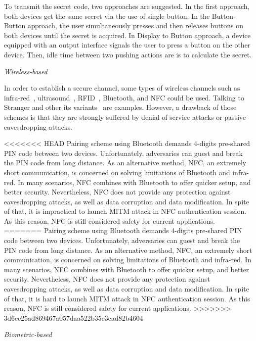 To transmit the secret code, two approaches are suggested. In the first approach, both devices get the same secret via the use of single button. In the Button-Button approach, the user simultaneously presses and then releases buttons on both devices until the secret is acquired. In Display to Button approach, a device equipped with an output interface signals the user to press a button on the other device. Then, idle time between two pushing actions are is to calculate the secret. 

\emph{Wireless-based}

In order to establish a secure channel, some types of wireless channels such as infra-red~\cite{5654588}, ultrasound~\cite{Mayrhofer06anauthentication}, RFID~\cite{Amariucai:2012aa}, Bluetooth, and NFC could be used. Talking to Stranger and other its variants~\cite{5654588,Mayrhofer06anauthentication,4159919,Amariucai:2012aa} are examples. However, a drawback of those schemes is that they are strongly suffered by denial of service attacks or passive eavesdropping attacks. 

<<<<<<< HEAD
Pairing scheme using Bluetooth demands 4-digits pre-shared PIN code between two devices. Unfortunately, adversaries can guest and break the PIN code from long distance. As an alternative method, NFC, an extremely short communication, is concerned on solving limitations of Bluetooth and infra-red. In many scenarios, NFC combines with Bluetooth to offer quicker setup, and better security. Nevertheless, NFC does not provide any protection against eavesdropping attacks, as well as data corruption and data modification. In spite of that, it is impractical to launch MITM attack in NFC authentication session. As this reason, NFC is still considered safety for current applications. 
=======
Pairing scheme using Bluetooth demands 4-digits pre-shared PIN code between two devices. Unfortunately, adversaries can guest and break the PIN code from long distance. As an alternative method, NFC, an extremely short communication, is concerned on solving limitations of Bluetooth and infra-red. In many scenarios, NFC combines with Bluetooth to offer quicker setup, and better security. Nevertheless, NFC does not provide any protection against eavesdropping attacks, as well as data corruption and data modification. In spite of that, it is hard to launch MITM attack in NFC authentication session. As this reason, NFC is still considered safety for current applications. 
>>>>>>> 3d6cc25ad869467a057daa522b35e3cad82b4604

\emph{Biometric-based}

